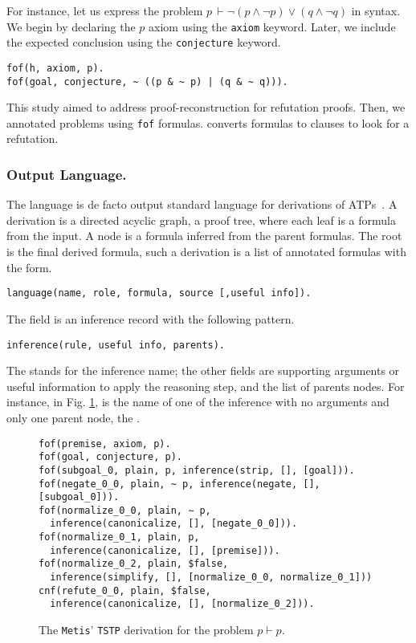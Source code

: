\documentclass[../main.tex]{subfiles}
\begin{document}
For instance, let us express the problem
$p\, \vdash \neg (p \wedge \neg p) ∨ (q \wedge \neg q)$
in \TPTP syntax. We begin by declaring the $p$ axiom using the \verb!axiom!
keyword. Later, we include the expected conclusion using the \verb!conjecture!
keyword.

\begin{verbatim}
fof(h, axiom, p).
fof(goal, conjecture, ~ ((p & ~ p) | (q & ~ q))).
\end{verbatim}

This study aimed to address proof-reconstruction for refutation
proofs. Then, we annotated  problems using \verb!fof! formulas.
\Metis converts  formulas to  clauses to look for a
refutation.

\subsubsection{Output Language.}
\label{ssec:output-language}

The \TSTP language is de facto output standard language
for derivations of ATPs~\cite{Sutcliffe-Schulz-Claessen-VanGelder-2006}.
A \TSTP derivation is a directed acyclic graph, a proof tree,
where each leaf is a formula from the \TPTP input. A node is a formula
inferred from the parent formulas. The root is the final derived formula,
such a derivation is a list of annotated formulas with the form.

\begin{verbatim}
language(name, role, formula, source [,useful info]).
\end{verbatim}

The  field is an inference record with the following
pattern.

\begin{verbatim}
inference(rule, useful info, parents).
\end{verbatim}

The  stands for the inference name; the other fields are
supporting arguments or useful information to apply the reasoning
step, and the list of parents nodes. For instance, in Fig.
\ref{fig:metis-proof-tstp}, \strip is the name of one of the
inference with no arguments and only one parent node, the
.

\begin{figure}
\begin{verbatim}
fof(premise, axiom, p).
fof(goal, conjecture, p).
fof(subgoal_0, plain, p, inference(strip, [], [goal])).
fof(negate_0_0, plain, ~ p, inference(negate, [], [subgoal_0])).
fof(normalize_0_0, plain, ∼ p,
  inference(canonicalize, [], [negate_0_0])).
fof(normalize_0_1, plain, p,
  inference(canonicalize, [], [premise])).
fof(normalize_0_2, plain, $false,
  inference(simplify, [], [normalize_0_0, normalize_0_1]))
cnf(refute_0_0, plain, $false,
  inference(canonicalize, [], [normalize_0_2])).
\end{verbatim}
\caption{The \texttt{Metis}' \texttt{TSTP} derivation for the
problem $p\vdash p$.}
\label{fig:metis-proof-tstp}
\end{figure}
\end{document}
